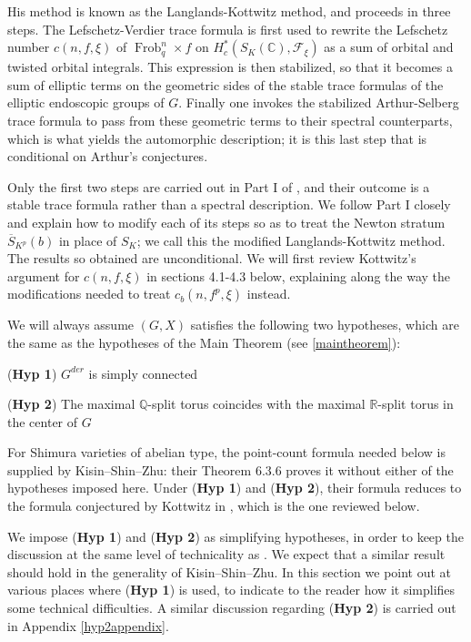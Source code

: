 \documentclass[11pt,a4paper]{article}
\newcommand{\HypOne}{\textbf{Hyp 1}}
\newcommand{\HypTwo}{\textbf{Hyp 2}}
\theoremstyle{definition}
\theoremstyle{plain}
\theoremstyle{remark}
\theoremstyle{plain}
\DeclareMathOperator{\Frob}{Frob}
\begin{document}
His method is known as the Langlands-Kottwitz method, and proceeds in three steps. The Lefschetz-Verdier trace formula is first used to rewrite the Lefschetz number $c(n,f,\xi)$ of $\Frob_q^n \times f$ on $H_c^*(S_K(\mathbb{C}), \mathcal{F}_{\xi})$ as a sum of orbital and twisted orbital integrals. This expression is then stabilized, so that it becomes a sum of elliptic terms on the geometric sides of the stable trace formulas of the elliptic endoscopic groups of $G$. Finally one invokes the stabilized Arthur-Selberg trace formula to pass from these geometric terms to their spectral counterparts, which is what yields the automorphic description; it is this last step that is conditional on Arthur's conjectures.

Only the first two steps are carried out in Part I of \cite{MR1044820}, and their outcome is a stable trace formula rather than a spectral description. We follow Part I closely and explain how to modify each of its steps so as to treat the Newton stratum $\overline{S}_{K^p}(b)$ in place of $S_K$; we call this the modified Langlands-Kottwitz method. The results so obtained are unconditional. We will first review Kottwitz's argument for $c(n,f,\xi)$ in sections 4.1-4.3 below, explaining along the way the modifications needed to treat $c_b(n,f^p,\xi)$ instead.

We will always assume $(G,X)$ satisfies the following two hypotheses, which are the same as the hypotheses of the Main Theorem (see \ref{maintheorem}):

\vspace{1mm}\hspace{2mm} (\textbf{Hyp 1}) $G^{der}$ is simply connected

\vspace{1mm}\hspace{2mm} (\textbf{Hyp 2}) The maximal $\mathbb{Q}$-split torus coincides with the maximal $\mathbb{R}$-split torus in the center of $G$

For Shimura varieties of abelian type, the point-count formula needed below is supplied by Kisin--Shin--Zhu: their Theorem 6.3.6 proves it without either of the hypotheses imposed here. Under (\HypOne{}) and (\HypTwo{}), their formula reduces to the formula conjectured by Kottwitz in \cite{MR1044820}, which is the one reviewed below.

We impose (\HypOne{}) and (\HypTwo{}) as simplifying hypotheses, in order to keep the discussion at the same level of technicality as \cite{MR1044820}. We expect that a similar result should hold in the generality of Kisin--Shin--Zhu. In this section we point out at various places where (\HypOne{}) is used, to indicate to the reader how it simplifies some technical difficulties. A similar discussion regarding (\HypTwo{}) is carried out in Appendix \ref{hyp2appendix}.
\end{document}
